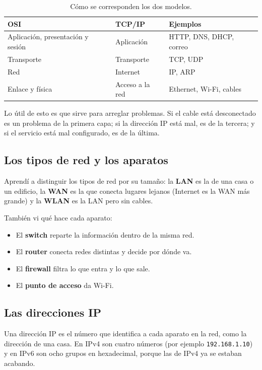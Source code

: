 \documentclass[11pt,a4paper]{article}
\begin{document}
\begin{table}[htbp]
  \centering
  \small
  \begin{tabular}{@{}lll@{}}
    \toprule
    \textbf{OSI} & \textbf{TCP/IP} & \textbf{Ejemplos} \\ \midrule
    Aplicación, presentación y sesión & Aplicación & HTTP, DNS, DHCP, correo \\
    Transporte & Transporte & TCP, UDP \\
    Red & Internet & IP, ARP \\
    Enlace y física & Acceso a la red & Ethernet, Wi-Fi, cables \\ \bottomrule
  \end{tabular}
  \caption{Cómo se corresponden los dos modelos.}
  \label{tab:osi}
\end{table}

Lo útil de esto es que sirve para arreglar problemas. Si el cable está
desconectado es un problema de la primera capa; si la dirección IP está mal, es
de la tercera; y si el servicio está mal configurado, es de la última.

\subsection{Los tipos de red y los aparatos}

Aprendí a distinguir los tipos de red por su tamaño: la \textbf{LAN} es la de
una casa o un edificio, la \textbf{WAN} es la que conecta lugares lejanos
(Internet es la WAN más grande) y la \textbf{WLAN} es la LAN pero sin cables.

También vi qué hace cada aparato:

\begin{itemize}[leftmargin=*]
  \item El \textbf{switch} reparte la información dentro de la misma red.
  \item El \textbf{router} conecta redes distintas y decide por dónde va.
  \item El \textbf{firewall} filtra lo que entra y lo que sale.
  \item El \textbf{punto de acceso} da Wi-Fi.
\end{itemize}

\subsection{Las direcciones IP}

Una dirección IP es el número que identifica a cada aparato en la red, como la
dirección de una casa. En IPv4 son cuatro números (por ejemplo
\texttt{192.168.1.10}) y en IPv6 son ocho grupos en hexadecimal, porque las de
IPv4 ya se estaban acabando.
\end{document}
